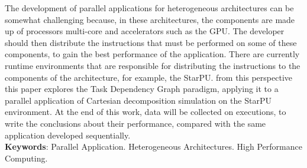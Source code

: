 
\begin{resumo}[ABSTRACT]
\begin{SingleSpacing}


The development of parallel applications for heterogeneous architectures can be somewhat challenging because,
in these architectures, the components are made up of processors multi-core and accelerators such as the GPU.
The developer should then distribute the instructions that must be performed on some of these components,
to gain the best performance of the application. There are currently runtime environments that are responsible
for distributing the instructions to the components of the architecture, for example, the StarPU.
from this perspective this paper explores the Task Dependency Graph paradigm, applying it to a parallel application
of Cartesian decomposition simulation on the StarPU environment. At the end of this work, data will be collected on
executions, to write the conclusions about their performance, compared with the same application developed sequentially. \\

\textbf{Keywords}: Parallel Application. Heterogeneous Architectures. High Performance Computing.

\end{SingleSpacing}
\end{resumo}

